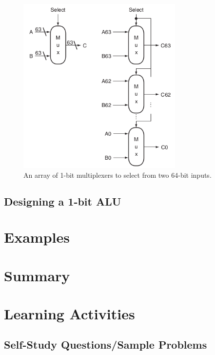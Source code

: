\documentclass[a4paper, 11pt,oneside]{article}
\begin{document}
\begin{figure}
	\begin{center}
	\includegraphics[height=3.5in]{mux_bits.png}
	\caption{An array of 1-bit multiplexers to select from two 64-bit inputs.}
	\label{fig:mux_bits} 
	\end{center}
\end{figure}

\subsection{Designing a 1-bit ALU}



\section{Examples}



\section{Summary}

\section{Learning Activities}

\subsection{Self-Study Questions/Sample Problems}


\end{document}
